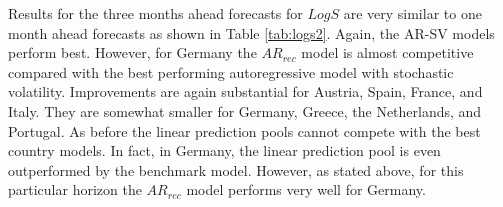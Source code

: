\documentclass[12pt,letterpaper,fleqn]{article}           %
\begin{document}
Results for the three months ahead forecasts for $LogS$ are very similar to one month ahead forecasts as shown in Table \ref{tab:logs2}. Again, the AR-SV models perform best. However, for Germany the $AR_{rec}$ model is almost competitive compared with the best performing autoregressive model with stochastic volatility. Improvements are again substantial for Austria, Spain, France, and Italy. They are somewhat smaller for Germany, Greece, the Netherlands, and Portugal. As before the linear prediction pools cannot compete with the best country models. In fact, in Germany, the linear prediction pool is even outperformed by the benchmark model. However, as stated above, for this particular horizon the $AR_{rec}$ model performs very well for Germany.

\begin{table}[!htbp]
\captionsetup{singlelinecheck=false, justification=justified}
\centering 
{}
\end{table}
\end{document}
